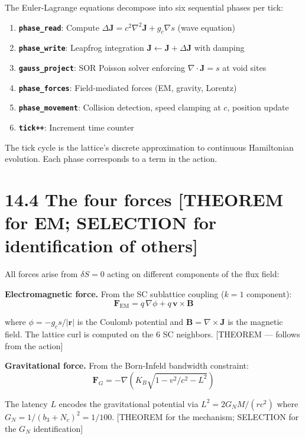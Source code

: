 \documentclass[
  11pt,
  letterpaper,
  twoside,
  openright]{book}
\providecommand{\tightlist}{%
  \setlength{\itemsep}{0pt}\setlength{\parskip}{0pt}}
\begin{document}
The Euler-Lagrange equations decompose into six sequential phases per
tick:

\begin{enumerate}
\def\labelenumi{\arabic{enumi}.}
\tightlist
\item
  \textbf{\texttt{phase\_read}}: Compute
  \(\Delta \mathbf{J} = c^2 \nabla^2 \mathbf{J} + g_c \nabla s\) (wave
  equation)
\item
  \textbf{\texttt{phase\_write}}: Leapfrog integration
  \(\mathbf{J} \leftarrow \mathbf{J} + \Delta \mathbf{J}\) with damping
\item
  \textbf{\texttt{gauss\_project}}: SOR Poisson solver enforcing
  \(\nabla \cdot \mathbf{J} = s\) at void sites
\item
  \textbf{\texttt{phase\_forces}}: Field-mediated forces (EM, gravity,
  Lorentz)
\item
  \textbf{\texttt{phase\_movement}}: Collision detection, speed clamping
  at \(c\), position update
\item
  \textbf{\texttt{tick++}}: Increment time counter
\end{enumerate}

The tick cycle is the lattice's discrete approximation to continuous
Hamiltonian evolution. Each phase corresponds to a term in the action.

\section{14.4 The four forces {[}THEOREM for EM; SELECTION for
identification of
others{]}}\label{the-four-forces-theorem-for-em-selection-for-identification-of-others}

All forces arise from \(\delta S = 0\) acting on different components of
the flux field:

\textbf{Electromagnetic force.} From the SC sublattice coupling
(\(k = 1\) component): \[
\mathbf{F}_{\text{EM}} = q \, \nabla \phi + q \, \mathbf{v} \times \mathbf{B}
\tag{14.8}
\]

where \(\phi = -g_c s / |\mathbf{r}|\) is the Coulomb potential and
\(\mathbf{B} = \nabla \times \mathbf{J}\) is the magnetic field. The
lattice curl is computed on the 6 SC neighbors. {[}THEOREM --- follows
from the action{]}

\textbf{Gravitational force.} From the Born-Infeld bandwidth constraint:
\[
\mathbf{F}_G = -\nabla \left( K_B \sqrt{1 - v^2/c^2 - L^2} \right)
\tag{14.9}
\]

The latency \(L\) encodes the gravitational potential via
\(L^2 = 2G_N M / (rc^2)\) where \(G_N = 1/(b_3 + N_c)^2 = 1/100\).
{[}THEOREM for the mechanism; SELECTION for the \(G_N\)
identification{]}
\end{document}
